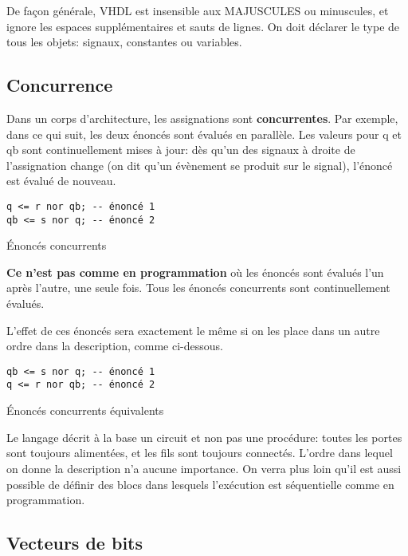 \documentclass[11pt]{article}
\begin{document}
De façon générale, VHDL est insensible aux MAJUSCULES ou minuscules,
et ignore les espaces supplémentaires et sauts de lignes. On doit
déclarer le type de tous les objets: signaux, constantes ou variables.

\subsection{Concurrence}
\label{sec:org28d197a}

Dans un corps d'architecture, les assignations sont
\textbf{concurrentes}. Par exemple, dans ce qui suit, les deux énoncés sont
évalués en parallèle. Les valeurs pour q et qb sont continuellement
mises à jour: dès qu'un des signaux à droite de l'assignation change
(on dit qu'un évènement se produit sur le signal), l'énoncé est évalué
de nouveau.

\begin{listing}[htbp]
\begin{verbatim}
q <= r nor qb; -- énoncé 1
qb <= s nor q; -- énoncé 2
\end{verbatim}
\caption{Énoncés concurrents}
\end{listing}

\textbf{Ce n'est pas comme en programmation} où les énoncés sont évalués
l'un après l'autre, une seule fois. Tous les énoncés concurrents sont
continuellement évalués.

L'effet de ces énoncés sera exactement le même si on les place dans un
autre ordre dans la description, comme ci-dessous.

\begin{listing}[htbp]
\begin{verbatim}
qb <= s nor q; -- énoncé 1
q <= r nor qb; -- énoncé 2
\end{verbatim}
\caption{Énoncés concurrents équivalents}
\end{listing}

Le langage décrit à la base un circuit et non pas une procédure:
toutes les portes sont toujours alimentées, et les fils sont toujours
connectés. L'ordre dans lequel on donne la description n'a aucune
importance. On verra plus loin qu'il est aussi possible de définir des blocs
dans lesquels l'exécution est séquentielle comme en programmation.

\subsection{Vecteurs de bits}
\label{sec:org2316a05}
\end{document}
